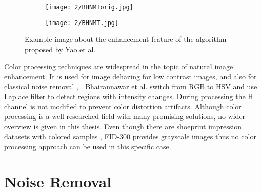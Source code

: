 \documentclass[draft,final]{vutinfth} %
\begin{document}
\begin{figure}[h]
  \centering
  \begin{subfigure}[b]{0.4\columnwidth}
    \centering
    \texttt{[image: 2/BHNMTorig.jpg]}
    \label{fig:rw:BHNMTin}
  \end{subfigure}
  \begin{subfigure}[b]{0.4\columnwidth}
    \centering
    \texttt{[image: 2/BHNMT.jpg]}
    \label{fig:rw:BHNMTout}
  \end{subfigure}
  \caption{Example image  \cite{yao2016image} about the enhancement feature of the algorithm proposed by Yao et al. \cite{yao2016image} }
  \label{fig:rw:BHNMT} %
\end{figure}

\par
Color processing techniques are widespread in the topic of natural image enhancement.
It is used for image dehazing for low contrast images, \cite{singh2018dehazing} and also for classical noise removal \cite{ren2018joint}, \cite{zhang2016simultaneous}. 
Bhairannawar et al. \cite{bhairannawar2017color} switch from RGB to HSV and use Laplace filter to detect regions with intensity changes. 
During processing the H channel is not modified to prevent color distortion artifacts.
Although color processing is a well researched field with many promising solutions, no wider overview is given in this thesis.
Even though there are shoeprint impression datasets with colored samples \cite{katireddy2017novel}, FID-300 provides grayscale images thus no color processing approach can be used in this specific case. 

\section{Noise Removal}
\end{document}
